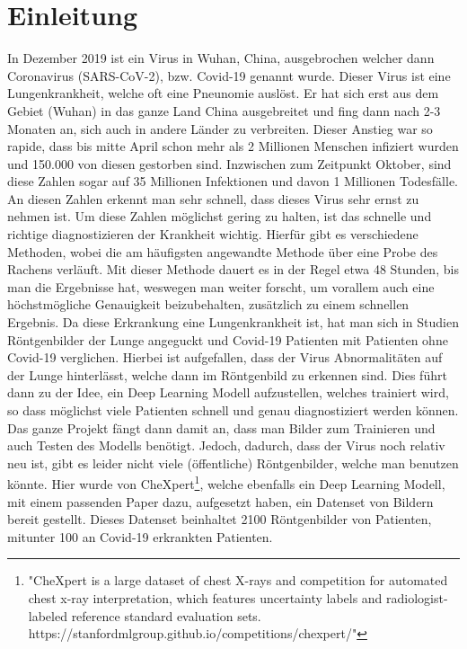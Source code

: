 \section{Einleitung}
\label{ch:einleitung}

In Dezember 2019 ist ein Virus in Wuhan, China, ausgebrochen welcher dann Coronavirus (SARS-CoV-2), bzw. Covid-19 genannt wurde. Dieser Virus ist eine Lungenkrankheit, welche oft eine Pneunomie auslöst. Er hat sich erst aus dem Gebiet (Wuhan) in das ganze Land China ausgebreitet und fing dann nach 2-3 Monaten an, sich auch in andere Länder zu verbreiten. Dieser Anstieg war so rapide, dass bis mitte April schon mehr als 2 Millionen Menschen infiziert wurden und 150.000 von diesen gestorben sind. Inzwischen zum Zeitpunkt Oktober, sind diese Zahlen sogar auf 35 Millionen Infektionen und davon 1 Millionen Todesfälle. An diesen Zahlen erkennt man sehr schnell, dass dieses Virus sehr ernst zu nehmen ist. Um diese Zahlen möglichst gering zu halten, ist das schnelle und richtige diagnostizieren der Krankheit wichtig. Hierfür gibt es verschiedene Methoden, wobei die am häufigsten angewandte Methode über eine Probe des Rachens verläuft. Mit dieser Methode dauert es in der Regel etwa 48 Stunden, bis man die Ergebnisse hat, weswegen man weiter forscht, um vorallem auch eine höchstmögliche Genauigkeit beizubehalten, zusätzlich zu einem schnellen Ergebnis. Da diese Erkrankung eine Lungenkrankheit ist, hat man sich in Studien Röntgenbilder der Lunge angeguckt und Covid-19 Patienten mit Patienten ohne Covid-19 verglichen. Hierbei ist aufgefallen, dass der Virus Abnormalitäten auf der Lunge hinterlässt, welche dann im Röntgenbild zu erkennen sind. Dies führt dann zu der Idee, ein Deep Learning Modell aufzustellen, welches trainiert wird, so dass möglichst viele Patienten schnell und genau diagnostiziert werden können.
\newline
Das ganze Projekt fängt dann damit an, dass man Bilder zum Trainieren und auch Testen des Modells benötigt. Jedoch, dadurch, dass der Virus noch relativ neu ist, gibt es leider nicht viele (öffentliche) Röntgenbilder, welche man benutzen könnte. Hier wurde von CheXpert\footnote{"CheXpert is a large dataset of chest X-rays and competition for automated chest x-ray interpretation, which features uncertainty labels and radiologist-labeled reference standard evaluation sets. https://stanfordmlgroup.github.io/competitions/chexpert/"}, welche ebenfalls ein Deep Learning Modell, mit einem passenden Paper dazu, aufgesetzt haben, ein Datenset von Bildern bereit gestellt. Dieses Datenset beinhaltet 2100 Röntgenbilder von Patienten, mitunter 100 an Covid-19 erkrankten Patienten.
